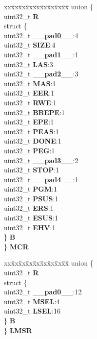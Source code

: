 \begin{DoxyCompactItemize}
\begin{tabbing}
\end{tabbing}\item 
\mbox{\label{structFLASH__tag_aa7c187e552a8cfcd6adb3304a865e72f}} 
\begin{tabbing}
xx\=xx\=xx\=xx\=xx\=xx\=xx\=xx\=xx\=\kill
union \{\\
\>uint32\_t {\bfseries R}\\
\>struct \{\\
\>\>uint32\_t {\bfseries \_\_pad0\_\_}:4\\
\>\>uint32\_t {\bfseries SIZE}:4\\
\>\>uint32\_t {\bfseries \_\_pad1\_\_}:1\\
\>\>uint32\_t {\bfseries LAS}:3\\
\>\>uint32\_t {\bfseries \_\_pad2\_\_}:3\\
\>\>uint32\_t {\bfseries MAS}:1\\
\>\>uint32\_t {\bfseries EER}:1\\
\>\>uint32\_t {\bfseries RWE}:1\\
\>\>uint32\_t {\bfseries BBEPE}:1\\
\>\>uint32\_t {\bfseries EPE}:1\\
\>\>uint32\_t {\bfseries PEAS}:1\\
\>\>uint32\_t {\bfseries DONE}:1\\
\>\>uint32\_t {\bfseries PEG}:1\\
\>\>uint32\_t {\bfseries \_\_pad3\_\_}:2\\
\>\>uint32\_t {\bfseries STOP}:1\\
\>\>uint32\_t {\bfseries \_\_pad4\_\_}:1\\
\>\>uint32\_t {\bfseries PGM}:1\\
\>\>uint32\_t {\bfseries PSUS}:1\\
\>\>uint32\_t {\bfseries ERS}:1\\
\>\>uint32\_t {\bfseries ESUS}:1\\
\>\>uint32\_t {\bfseries EHV}:1\\
\>\} {\bfseries B}\\
\} {\bfseries MCR}\\

\end{tabbing}\item 
\mbox{\label{structFLASH__tag_a7d8206c30838de7355e3cabcbdad8a29}} 
\begin{tabbing}
xx\=xx\=xx\=xx\=xx\=xx\=xx\=xx\=xx\=\kill
union \{\\
\>uint32\_t {\bfseries R}\\
\>struct \{\\
\>\>uint32\_t {\bfseries \_\_pad0\_\_}:12\\
\>\>uint32\_t {\bfseries MSEL}:4\\
\>\>uint32\_t {\bfseries LSEL}:16\\
\>\} {\bfseries B}\\
\} {\bfseries LMSR}\\


\end{tabbing}
\end{DoxyCompactItemize}

